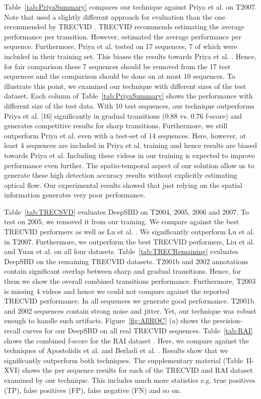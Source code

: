 \documentclass[journal]{IEEEtran}
\begin{document}
Table~\ref{tab:PriyaSummary} compares our technique against Priya et al. \cite{Priya14} on T2007. Note that \cite{Priya14} used a slightly  different approach for evaluation than the one recommended by TRECVID \cite{Smeaton10}. TRECVID recommends estimating the average performance per transition. However, \cite{Priya14} estimated the average performance per sequence. Furthermore, Priya et al. tested on 17 sequences, 7 of which were included in their training set. This biases the results towards Priya et al. \cite{Priya14}. Hence, for fair comparison these 7 sequences should be removed from the 17 test sequences and the comparison should be done on at most 10 sequences. To illustrate this point, we examined our technique with different sizes of the test dataset. Each column of Table~\ref{tab:PriyaSummary} shows the performance with different size of the test data. With 10 test sequences, our technique outperforms Priya et al. [16] significantly in gradual transitions (0.88 vs. 0.76 f-score) and generates competitive results for sharp transitions. Furthermore, we still outperform Priya et al. even with a test-set of 14 sequences. Here, however, at least 4 sequences are included in Priya et al. training and hence results are biased towards Priya et al. Including these videos in our training is expected to improve performance even further. The spatio-temporal aspect of our solution allow us to generate these high detection accuracy results without explicitly estimating optical flow. Our experimental results showed that just relying on the spatial information generates very poor performance. 




Table~\ref{tab:TRECSVD} evaluates DeepSBD on T2004, 2005, 2006 and 2007. To test on 2005, we removed it from our training. We compare against the best TRECVID performers as well as Lu et al. \cite{Lu13}. We significantly outperform Lu et al. in T2007. Furthermore, we outperform the best TRECVID performers, Liu et al. \cite{Liu07} and Yuan et al. \cite{Yuan04} on all four datasets.
Table~\ref{tab:TRECRemaining} evaluates DeepSBD on the remaining TRECVID datasets. T2001b and 2002 annotations contain significant overlap between sharp and gradual transitions. Hence, for them we show the overall combined transitions performance. Furthermore, T2003 is missing 4 videos and hence we could not compare against the reported TRECVID performance. In all sequences we generate good performance. T2001b and 2002 sequences contain strong noise and jitter. Yet, our technique was robust enough to handle such artifacts. Figure~\ref{fig:AllROC} (a) shows the precision-recall curves for our DeepSBD on all real TRECVID sequences. Table~\ref{tab:RAI} shows the combined f-score for the RAI dataset \cite{RAIData}. Here, we compare against the techniques of Apostolidis et al. \cite{Apostolidis14} and Berladi et al. \cite{Berladi15}. Results show that we significantly outperform both techniques. The supplementary material (Table~II-XVI) shows the per sequence results for each of the TRECVID and RAI dataset examined by our technique. This includes much more statistics e.g. true positives (TP), false positives (FP), false negative (FN) and so on. 
\end{document}
